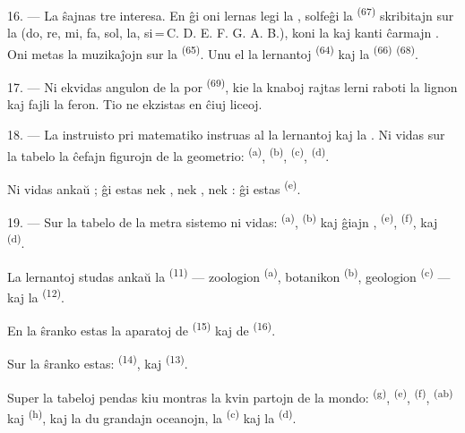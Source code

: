 16. --- La  ŝajnas tre interesa. En ĝi oni lernas legi la
, solfeĝi la  \textsuperscript{(67)}
skribitajn sur la  (do, re, mi, fa, sol, la, si\,=\,C. D. E.
F. G. A. B.), koni la  kaj kanti ĉarmajn .
Oni metas la muzikaĵojn sur la  \textsuperscript{(65)}. Unu el
la lernantoj  \textsuperscript{(64)} kaj la
 \textsuperscript{(66)} 
\textsuperscript{(68)}.

17. --- Ni ekvidas angulon de la  por 
\textsuperscript{(69)}, kie la knaboj rajtas lerni raboti la lignon kaj fajli
la feron. Tio ne ekzistas en ĉiuj liceoj.

\VUsaut{5.0mm}
\VUsaut{3.6mm}

18. --- La instruisto pri matematiko instruas al la lernantoj
 kaj la . Ni
vidas sur la tabelo la ĉefajn figurojn de la geometrio:
 \textsuperscript{(a)}, 
\textsuperscript{(b)},  \textsuperscript{(c)},
 \textsuperscript{(d)}.

Ni vidas ankaŭ ; ĝi estas nek , nek
, nek : ĝi estas 
\textsuperscript{(e)}.

19. --- Sur la tabelo de la metra sistemo ni vidas: 
\textsuperscript{(a)},  \textsuperscript{(b)} kaj ĝiajn
,  \textsuperscript{(e)},
 \textsuperscript{(f)},  kaj
 \textsuperscript{(d)}.

La lernantoj studas ankaŭ la 
\textsuperscript{(11)} --- zoologion \textsuperscript{(a)}, botanikon
\textsuperscript{(b)}, geologion \textsuperscript{(c)} --- kaj la
 \textsuperscript{(12)}.

En la ŝranko estas la aparatoj de  \textsuperscript{(15)} kaj de
 \textsuperscript{(16)}.

Sur la ŝranko estas:  \textsuperscript{(14)}, 
kaj  \textsuperscript{(13)}.

Super la tabeloj pendas  kiu montras la kvin partojn de la mondo:
 \textsuperscript{(g)},  \textsuperscript{(e)},
 \textsuperscript{(f)}, 
\textsuperscript{(ab)} kaj  \textsuperscript{(h)}, kaj la du
grandajn oceanojn, la  \textsuperscript{(c)} kaj la
 \textsuperscript{(d)}.
\VUsaut{6.0mm}
\VUfilet{22mm}
